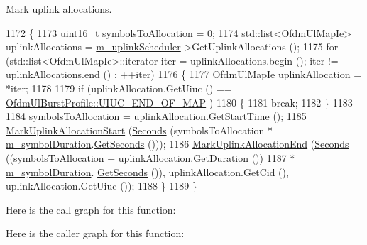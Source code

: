 Mark uplink allocations. 


\begin{DoxyCode}
1172 \{
1173   uint16\_t symbolsToAllocation = 0;
1174   std::list<OfdmUlMapIe> uplinkAllocations = \hyperlink{classns3_1_1BaseStationNetDevice_a14803d3fbd21b8777a8c7c7aeef8b8ba}{m\_uplinkScheduler}->GetUplinkAllocations ();
1175   \textcolor{keywordflow}{for} (std::list<OfdmUlMapIe>::iterator iter = uplinkAllocations.begin (); iter != uplinkAllocations.end ()
      ; ++iter)
1176     \{
1177       OfdmUlMapIe uplinkAllocation = *iter;
1178 
1179       \textcolor{keywordflow}{if} (uplinkAllocation.GetUiuc () == \hyperlink{classns3_1_1OfdmUlBurstProfile_ae528783c4b3c6700ff49dfd7a555cb3dabef491e8d426af16beba1541b947b7e9}{OfdmUlBurstProfile::UIUC\_END\_OF\_MAP}
      )
1180         \{
1181           \textcolor{keywordflow}{break};
1182         \}
1183 
1184       symbolsToAllocation = uplinkAllocation.GetStartTime ();
1185       \hyperlink{classns3_1_1BaseStationNetDevice_a5dba5c57e8bb0daa9078235a047268ec}{MarkUplinkAllocationStart} (\hyperlink{group__timecivil_ga33c34b816f8ff6628e33d5c8e9713b9e}{Seconds} (symbolsToAllocation * 
      \hyperlink{classns3_1_1BaseStationNetDevice_aa05b0ce117a76f70b9c4062d9d687e57}{m\_symbolDuration}.\hyperlink{classns3_1_1Time_a8f20d5c3b0902d7b4320982f340b57c8}{GetSeconds} ()));
1186       \hyperlink{classns3_1_1BaseStationNetDevice_a8adcdd3212410b4ef091658d701b99fa}{MarkUplinkAllocationEnd} (\hyperlink{group__timecivil_ga33c34b816f8ff6628e33d5c8e9713b9e}{Seconds} ((symbolsToAllocation + 
      uplinkAllocation.GetDuration ())
1187                                         * \hyperlink{classns3_1_1BaseStationNetDevice_aa05b0ce117a76f70b9c4062d9d687e57}{m\_symbolDuration}.
      \hyperlink{classns3_1_1Time_a8f20d5c3b0902d7b4320982f340b57c8}{GetSeconds} ()), uplinkAllocation.GetCid (), uplinkAllocation.GetUiuc ());
1188     \}
1189 \}
\end{DoxyCode}


Here is the call graph for this function\+:




Here is the caller graph for this function\+:


